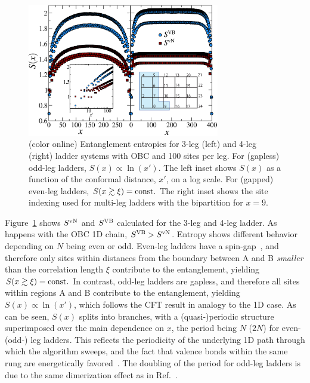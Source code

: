 \documentclass[prl,aps,twocolumn,floatfix,amsmath,amssymb,superscriptaddress,tightenlines]{revtex4}
\begin{document}
\begin{figure} { \includegraphics[width=3.3in]{FIG23NEW.eps}
\caption{(color online) Entanglement entropies for 3-leg (left)
and 4-leg (right) ladder systems with OBC and 100 sites per leg.  For
(gapless) odd-leg ladders, $S(x)\propto\ln(x')$.  The left
inset shows $S(x)$ as a function of the conformal distance, $x'$, on a log
scale. For (gapped) even-leg ladders, $S(x\gtrsim\xi)= {\rm const}.$
The right inset shows the site indexing used for multi-leg ladders with the
bipartition for $x=9$.  \label{ladder} }} \end{figure}

Figure~\ref{ladder} shows $S^{ \rm vN}$ and $S^{\rm VB}$ calculated
for the 3-leg and 4-leg ladder. As happens with the OBC 1D chain, $S^{\rm VB} > S^{ \rm vN}$.  
Entropy shows different behavior depending on
$N$ being even or odd.  Even-leg ladders have a
spin-gap~\cite{White1994}, and therefore only sites within distances from
the boundary between A and B {\it smaller} than the correlation length
$\xi$ contribute to the entanglement, yielding $S(x\gtrsim \xi)= {\rm
const}.$ In contrast, odd-leg ladders are gapless, and therefore all
sites within regions A and B contribute to the entanglement, 
yielding $S(x)\propto\ln(x')$, 
which follows the CFT result in
analogy to the 1D case. As can be seen, $S(x)$ splits into branches, with a
(quasi-)periodic structure superimposed over the main dependence on $x$,
the period being $N$ ($2N$) for even- (odd-) leg ladders. This reflects the
periodicity of the underlying 1D path through which the algorithm sweeps, and the fact that
valence bonds within the same rung are energetically
favored~\cite{White1994}. The doubling of the period for odd-leg ladders
is due to the same dimerization effect as in Ref.~\cite{Ian1}.
\end{document}
